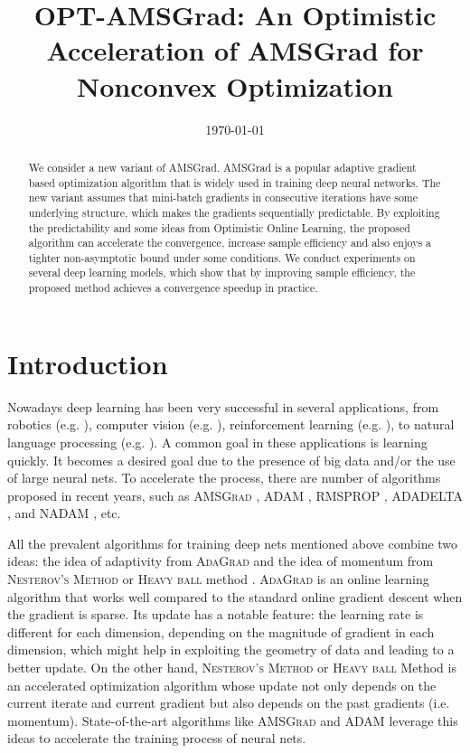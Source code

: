 \documentclass[11pt]{article}
\theoremstyle{k}
\begin{document}
\title{OPT-AMSGrad: An Optimistic Acceleration of AMSGrad for Nonconvex Optimization}
\date{\today}

\maketitle


\begin{abstract}
We consider a new variant of AMSGrad. 
AMSGrad \cite{RKK18} is a popular adaptive gradient based optimization algorithm that is widely used in training deep neural networks. 
The new variant assumes that mini-batch gradients in consecutive iterations have some underlying structure, which makes the gradients sequentially predictable. 
By exploiting the predictability and some ideas from Optimistic Online Learning, the proposed algorithm can accelerate the convergence, increase sample efficiency and also enjoys a tighter non-asymptotic bound under some conditions. 
We conduct experiments on several deep learning models, which show that by improving sample efficiency, the proposed method achieves a convergence speedup in practice.
\end{abstract}

\section{Introduction}

Nowadays deep learning has been very successful in several applications, from 
robotics (e.g. \cite{LFDA17}), 
computer vision (e.g. \cite{Rnet16,goodfellow2014generative}),
reinforcement learning (e.g. \cite{Atari13}),
to 
natural language processing (e.g. \cite{GMH13}).
A common goal in these applications is learning quickly.
It becomes a desired goal 
due to the presence of big data and/or the use of large neural nets.
To accelerate the process, there are number of algorithms proposed in recent years, such as 
\textsc{AMSGrad} \cite{RKK18}, 
\textsc{ADAM} \cite{KB15}, \textsc{RMSPROP} \cite{TH12}, \textsc{ADADELTA} \cite{Z12}, and \textsc{NADAM} \cite{D16}, etc.

All the prevalent algorithms for training deep nets mentioned above combine two ideas: the idea of adaptivity from \textsc{AdaGrad} \cite{DHS11,MS10} and the idea of momentum from \textsc{Nesterov's  Method} \cite{N04} or \textsc{Heavy ball} method \cite{P64}.
\textsc{AdaGrad} is an online learning algorithm that works well compared to the standard online gradient descent when the gradient is sparse.
Its update has a notable feature: the learning rate is different for each dimension, depending on the magnitude of gradient in each dimension, which might help in exploiting the geometry of data and leading to a better update. 
On the other hand,
\textsc{Nesterov's Method} or \textsc{Heavy ball} Method \cite{P64} is an accelerated optimization algorithm whose update not only depends on the current iterate and current gradient but also depends on the past gradients (i.e. momentum). State-of-the-art algorithms like \textsc{AMSGrad} \cite{RKK18} and \textsc{ADAM} \cite{KB15} leverage this ideas to accelerate the training process of neural nets.
\end{document}
